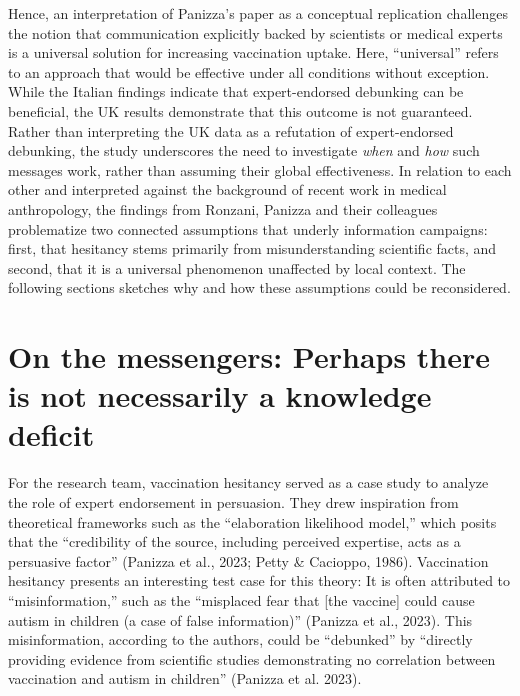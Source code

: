 \documentclass[authordate, reflection]{jote-new-article}
\begin{document}
	Hence, an interpretation of Panizza's paper as a conceptual replication challenges the notion that communication explicitly backed by scientists or medical experts is a universal solution for increasing vaccination uptake. Here, “universal” refers to an approach that would be effective under all conditions without exception. While the Italian findings indicate that expert-endorsed debunking can be beneficial, the UK results demonstrate that this outcome is not guaranteed. Rather than interpreting the UK data as a refutation of expert-endorsed debunking, the study underscores the need to investigate \emph{when} and \emph{how} such messages work, rather than assuming their global effectiveness. In relation to each other and interpreted against the background of recent work in medical anthropology, the findings from Ronzani, Panizza and their colleagues problematize two connected assumptions that underly information campaigns: first, that hesitancy stems primarily from misunderstanding scientific facts, and second, that it is a universal phenomenon unaffected by local context. The following sections sketches why and how these assumptions could be reconsidered.



	\section{On the messengers: Perhaps there is not necessarily a knowledge deficit}



	For the research team, vaccination hesitancy served as a case study to analyze the role of expert endorsement in persuasion. They drew inspiration from theoretical frameworks such as the “elaboration likelihood model,” which posits that the “credibility of the source, including perceived expertise, acts as a persuasive factor” (Panizza et al., 2023; Petty \& Cacioppo, 1986). Vaccination hesitancy presents an interesting test case for this theory: It is often attributed to “misinformation,” such as the “misplaced fear that [the vaccine] could cause autism in children (a case of false information)” (Panizza et al., 2023). This misinformation, according to the authors, could be “debunked” by “directly providing evidence from scientific studies demonstrating no correlation between vaccination and autism in children” (Panizza et al. 2023).
\end{document}
